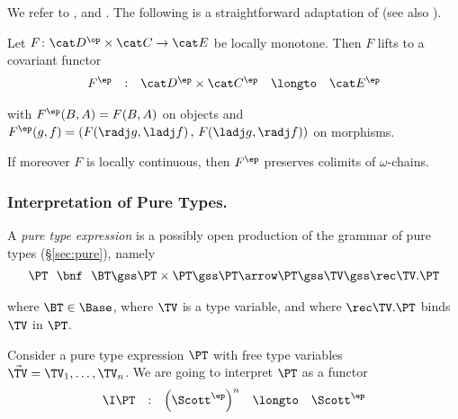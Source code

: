 \noindent
We refer to \cite[Definition 5.2.5]{aj95chapter},
\cite[Definition 7.1.15]{ac98book}
and \cite[Definition 9.1]{streicher06book}.
%
The following is a straightforward adaptation of \cite[Proposition 7.1.19]{ac98book}
(see also \cite[Proposition 5.2.6]{aj95chapter}).

\begin{lemma}
\label{lem:proof:scott:lift}
Let
$F \colon \cat D^\op \times \cat C \to \cat E$
be locally monotone.
Then $F$ lifts to a covariant functor
\[
\begin{array}{*{5}{l}}
  F^\ep
& :
& \cat D^\ep \times \cat C^\ep
& \longto
& \cat E^\ep
\end{array}
\]

\noindent
with $F^\ep(B,A) = F(B,A)$ on objects and
$F^\ep(g,f) = (F(\radj g,\ladj f) \,,\, F(\ladj g,\radj f))$
on morphisms.

If moreover $F$ is locally continuous, then $F^\ep$
preserves colimits of $\omega$-chains.
\end{lemma}



\subsubsection{Interpretation of Pure Types.}
A \emph{pure type expression} is a possibly open production of the
grammar of pure types (\S\ref{sec:pure}), namely
\[
\begin{array}{r @{\ \ }c@{\ \ } l}
     \PT
&    \bnf
&    \BT
\gss \PT \times \PT
\gss \PT \arrow \PT
\gss \TV
\gss \rec \TV.\PT 
\end{array}
\]

\noindent
where $\BT \in \Base$,
where $\TV$ is a type variable,
and where $\rec\TV.\PT$ binds $\TV$ in $\PT$.

Consider a pure type expression $\PT$ with free
type variables $\vec \TV = \TV_1,\dots,\TV_n$.
We are going to interpret $\PT$ as a functor
\[
\begin{array}{*{5}{l}}
  \I\PT
& :
& \left( \Scott^\ep \right)^{n}
& \longto
& \Scott^\ep
\end{array}
\]

